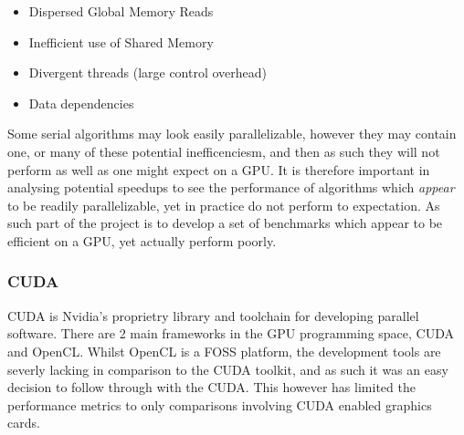 \begin{itemize}
\item Dispersed Global Memory Reads
\item Inefficient use of Shared Memory
\item Divergent threads (large control overhead)
\item Data dependencies
\end{itemize}

Some serial algorithms may look easily parallelizable, however they may contain one, or many of these potential inefficenciesm, and then as such they will not perform as well as one might expect on a GPU. It is therefore important in analysing potential speedups to see the performance of algorithms which \emph{appear} to be readily parallelizable, yet in practice do not perform to expectation. As such part of the project is to develop a set of benchmarks which appear to be efficient on a GPU, yet actually perform poorly.

\subsubsection{CUDA}
CUDA is Nvidia's proprietry library and toolchain for developing parallel software. There are 2 main frameworks in the GPU programming space, CUDA and OpenCL. Whilst OpenCL is a FOSS platform, the development tools are severly lacking in comparison to the CUDA toolkit, and as such it was an easy decision to follow through with the CUDA. This however has limited the performance metrics to only comparisons involving CUDA enabled graphics cards.



